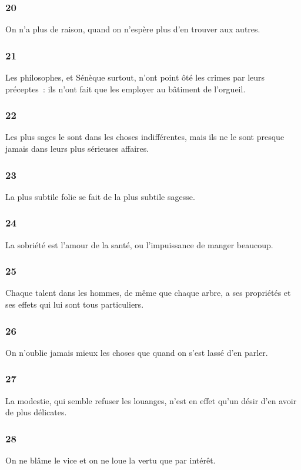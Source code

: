 \documentclass[french,twoside]{book} %
\begin{document}
\subsubsection[{20}]{ \textsc{20} }
\noindent On n’a plus de raison, quand on n’espère plus d’en trouver aux autres.
\subsubsection[{21}]{ \textsc{21} }
\noindent Les philosophes, et Sénèque surtout, n’ont point ôté les crimes par leurs préceptes : ils n’ont fait que les employer au bâtiment de l’orgueil.
\subsubsection[{22}]{ \textsc{22} }
\noindent Les plus sages le sont dans les choses indifférentes, mais ils ne le sont presque jamais dans leurs plus sérieuses affaires.
\subsubsection[{23}]{ \textsc{23} }
\noindent La plus subtile folie se fait de la plus subtile sagesse.
\subsubsection[{24}]{ \textsc{24} }
\noindent La sobriété est l’amour de la santé, ou l’impuissance de manger beaucoup.
\subsubsection[{25}]{ \textsc{25} }
\noindent Chaque talent dans les hommes, de même que chaque arbre, a ses propriétés et ses effets qui lui sont tous particuliers.
\subsubsection[{26}]{ \textsc{26} }
\noindent On n’oublie jamais mieux les choses que quand on s’est lassé d’en parler.
\subsubsection[{27}]{ \textsc{27} }
\noindent La modestie, qui semble refuser les louanges, n’est en effet qu’un désir d’en avoir de plus délicates.
\subsubsection[{28}]{ \textsc{28} }
\noindent On ne blâme le vice et on ne loue la vertu que par intérêt.
\end{document}

